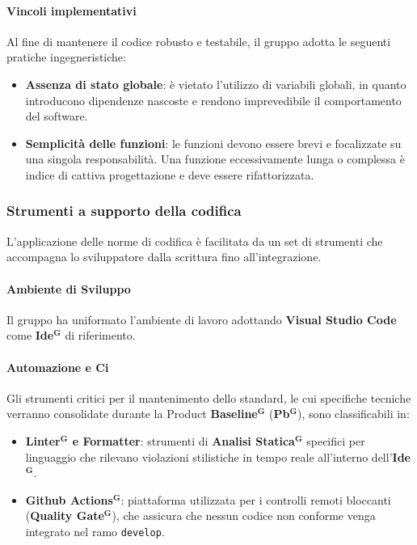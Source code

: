 \documentclass[a4paper,12pt]{article}
\newcommand{\term}[1]{\textbf{#1}$^\mathbf{G}$}
\newcommand{\ignoreglossary}{}
\begin{document}
\paragraph{Vincoli implementativi}
Al fine di mantenere il codice robusto e testabile, il gruppo adotta le seguenti pratiche ingegneristiche:
\begin{itemize}
    \item \textbf{Assenza di stato globale}: è vietato l'utilizzo di variabili globali, in quanto introducono dipendenze nascoste e rendono imprevedibile il comportamento del software.
    \item \textbf{Semplicità delle funzioni}: le funzioni devono essere brevi e focalizzate su una singola responsabilità. Una funzione eccessivamente lunga o complessa è indice di cattiva progettazione e deve essere rifattorizzata.
\end{itemize}

\subsubsection{Strumenti a supporto della codifica}
L'applicazione delle norme di codifica è facilitata da un set di strumenti che accompagna lo sviluppatore dalla scrittura fino all'integrazione.

\paragraph{Ambiente di Sviluppo}
Il gruppo ha uniformato l'ambiente di lavoro adottando \textbf{Visual Studio Code} come \term{Ide} di riferimento.

\paragraph{Automazione e \ignoreglossary{Ci}}
Gli strumenti critici per il mantenimento dello standard, le cui specifiche tecniche verranno consolidate durante la Product \term{Baseline} (\term{Pb}), sono classificabili in:
\begin{itemize}
    \item \textbf{\term{Linter} e Formatter}: strumenti di \term{Analisi Statica} specifici per linguaggio che rilevano violazioni stilistiche in tempo reale all'interno dell'\term{Ide}.
    \item \textbf{\term{Github Actions}}: piattaforma utilizzata per i controlli remoti bloccanti (\term{Quality Gate}), che assicura che nessun codice non conforme venga integrato nel ramo \texttt{develop}.
\end{itemize}
\end{document}
